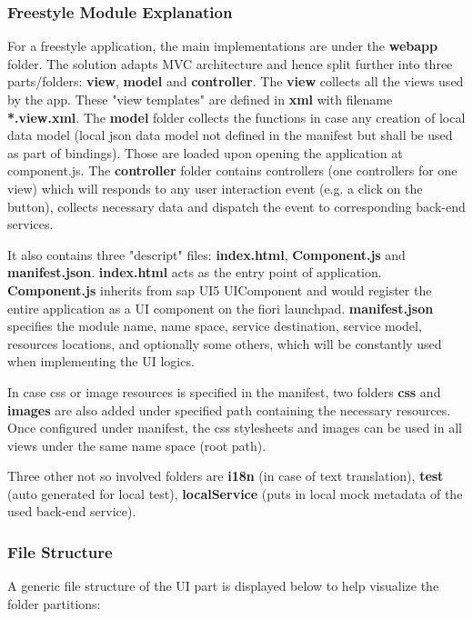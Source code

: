 \subsubsection{Freestyle Module Explanation}
For a freestyle application, the main implementations are under the \textbf{webapp} folder. The solution adapts MVC architecture and hence split further into three parts/folders: \textbf{view}, \textbf{model} and \textbf{controller}. The \textbf{view} collects all the views used by the app. These "view templates" are defined in \textbf{xml} with filename \textbf{*.view.xml}. The \textbf{model} folder collects the functions in case any creation of local data model (local json data model not defined in the manifest but shall be used as part of bindings). Those are loaded upon opening the application at component.js. The \textbf{controller} folder contains controllers (one controllers for one view) which will responds to any user interaction event (e.g. a click on the button), collects necessary data and dispatch the event to corresponding back-end services.

It also contains three "descript" files: \textbf{index.html}, \textbf{Component.js} and \textbf{manifest.json}. \textbf{index.html} acts as the entry point of application.  \textbf{Component.js} inherits from sap UI5 UIComponent and would register the entire application as a UI component on the fiori launchpad. \textbf{manifest.json} specifies the module name, name space, service destination, service model, resources locations, and optionally some others, which will be constantly used when implementing the UI logics.

In case css or image resources is specified in the manifest, two folders \textbf{css} and \textbf{images} are also added under specified path containing the necessary resources. Once configured under manifest, the css stylesheets and images can be used in all views under the same name space (root path).

Three other not so involved folders are \textbf{i18n} (in case of text translation), \textbf{test} (auto generated for local test), \textbf{localService} (puts in local mock metadata of the used back-end service).

\subsubsection{File Structure}

A generic file structure of the UI part is displayed below to help visualize the folder partitions: 

